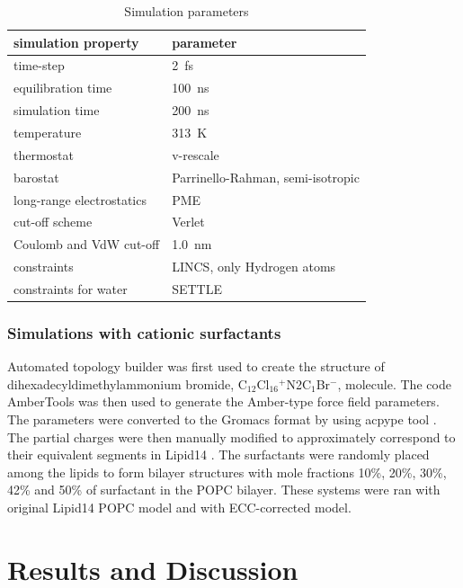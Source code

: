 \documentclass[aip,jcp,twocolumn]{revtex4}
\begin{document}
\begin{table}[btp]
  \caption{Simulation parameters}
  \label{tbl:mdpar}
  \begin{tabular}{ll}
    simulation property & parameter   \\
    \hline
    time-step           & 2~fs         \\
    equilibration time  & 100~ns  \\
    simulation time     & 200~ns  \\
    temperature         & 313~K       \\
    thermostat          & v-rescale  \cite{bussi07}   \\
    barostat            & Parrinello-Rahman, semi-isotropic \cite{parrinello81} \\
    long-range electrostatics & PME  \cite{darden93}  \\
    cut-off scheme      & Verlet \cite{Pall13}      \\
    Coulomb and VdW cut-off & 1.0~nm \\
    constraints         & LINCS, only Hydrogen atoms \cite{hess97} \\
    constraints for water & SETTLE  \cite{miyamoto92} \\
    \hline
  \end{tabular}
\end{table}


\subsubsection{Simulations with cationic surfactants}
Automated topology builder \cite{malde11} was first used to create the structure of
dihexadecyldimethylammonium bromide, C$_{12}$Cl$_{16}$$^+$N2C$_1$Br$^-$, molecule.
The code AmberTools \cite{amber} was then used to generate the Amber-type force field
parameters. The parameters were converted to the Gromacs format by using
acpype tool \cite{acpype}. The partial charges were then manually modified
to approximately correspond to their equivalent segments in Lipid14 \cite{dickson14}.
The surfactants were randomly placed among the lipids to form bilayer structures with
mole fractions 10\%, 20\%, 30\%, 42\% and 50\% of surfactant in the POPC bilayer.
These systems were ran with original Lipid14 POPC model and with ECC-corrected model.

\section{Results and Discussion}
\end{document}
